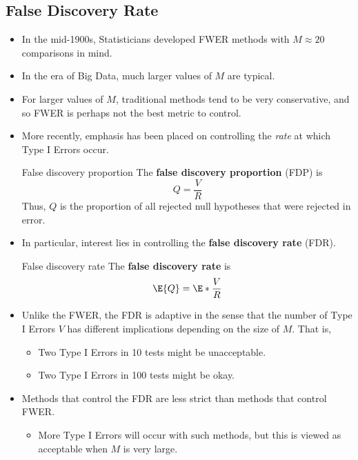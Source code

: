 \subsection{False Discovery Rate}
\begin{itemize}
    \item In the mid-1900s, Statisticians developed FWER methods with $ M\approx 20 $ comparisons in mind.
    \item In the era of Big Data, much larger values of $M$ are typical.
    \item For larger values of $M$, traditional methods tend to be very conservative, and so FWER is perhaps
          not the best metric to control.
    \item More recently, emphasis has been placed on controlling the \emph{rate} at which Type I Errors occur.
          \begin{Definition}{False discovery proportion}{}
              The \textbf{false discovery proportion} (FDP) is
              \[ Q=\frac{V}{R} \]
              Thus, $ Q $ is the proportion of all rejected null hypotheses that were rejected
              in error.
          \end{Definition}
    \item In particular, interest lies in controlling the \textbf{false discovery rate} (FDR).
          \begin{Definition}{False discovery rate}{}
              The \textbf{false discovery rate} is
              \[ \E{Q}=\E*{\frac{V}{R}} \]
          \end{Definition}
    \item Unlike the FWER, the FDR is adaptive in the sense that the number of Type I Errors $V$ has different
          implications depending on the size of $M$. That is,
          \begin{itemize}
              \item Two Type I Errors in 10 tests might be unacceptable.
              \item Two Type I Errors in 100 tests might be okay.
          \end{itemize}
    \item Methods that control the FDR are less strict than methods that control FWER\@.
          \begin{itemize}
              \item More Type I Errors will occur with such methods, but this is viewed as acceptable when $M$ is
                    very large.
          \end{itemize}
\end{itemize}
